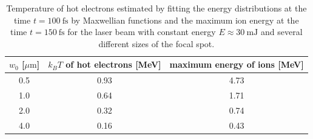 \begingroup
\renewcommand*{\arraystretch}{1.5}
\begin{table}[h!]
	\centering
	\begin{tabular}{c | c | c }
		$ w_0 $ [$ \mu\mathrm{m} $]	& $ k_B T $ of hot electrons [MeV] & maximum energy of ions [MeV] \\ \hline \hline
		0.5 & 0.93 & 4.73 \\ \hline
		1.0 & 0.64 & 1.71 \\ \hline
		2.0 & 0.32 & 0.74 \\ \hline
		4.0 & 0.16 & 0.43 \\
	\end{tabular}
	\caption{Temperature of hot electrons estimated by fitting the energy distributions at the time $ t = 100 \ \mathrm{fs} $ by Maxwellian functions and the maximum ion energy at the time $ t = 150 \ \mathrm{fs} $ for the laser beam with constant energy $ E \approx 30 \ \mathrm{mJ} $ and several different sizes of the focal spot.}
	\label{table:3}
\end{table}
\endgroup

